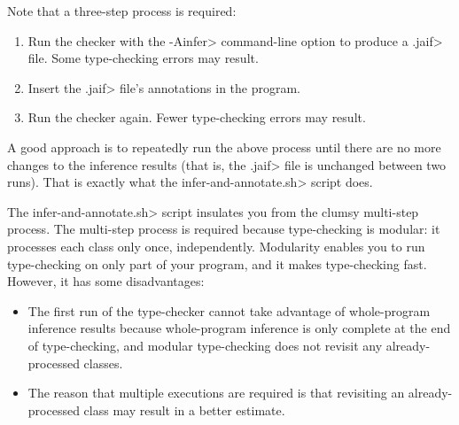 Note that a three-step process is required:
\begin{enumerate}
\item Run the checker with the \<-Ainfer> command-line option to
  produce a \<.jaif> file.  Some type-checking errors may result.
\item Insert the \<.jaif> file's annotations in the program.
\item Run the checker again.  Fewer type-checking errors may result.
\end{enumerate}
\noindent
A good approach is to repeatedly run the above process until there are no
more changes to the inference results (that is, the \<.jaif> file is
unchanged between two runs).  That is exactly what the
\<infer-and-annotate.sh> script does.

The \<infer-and-annotate.sh> script insulates you from the
clumsy multi-step process.  The multi-step process
is required because type-checking is modular:
it processes each class only once, independently.  Modularity enables you
to run type-checking on only part of your program, and
it makes type-checking fast.  However, it has some disadvantages:
\begin{itemize}
\item
  The first run of the type-checker cannot take advantage
  of whole-program inference results because whole-program inference is only complete at the
  end of type-checking, and modular type-checking does not revisit any
  already-processed classes.
\item
  The reason that multiple executions are required is that revisiting an
  already-processed class may result in a better estimate.
\end{itemize}



